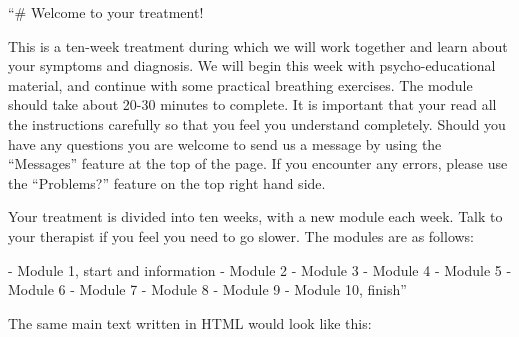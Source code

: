 \documentclass[
]{book}
\newenvironment{Shaded}{\begin{snugshade}}{\end{snugshade}}
\newcommand{\NormalTok}[1]{#1}
\newcommand{\SpecialStringTok}[1]{\textcolor[rgb]{0.31,0.60,0.02}{#1}}
\begin{document}
\begin{Shaded}
\begin{Highlighting}[]
\NormalTok{“\# Welcome to your treatment!}

\NormalTok{This is a ten{-}week treatment during which we will work together and learn}
\NormalTok{about your symptoms and diagnosis. We will begin this week with}
\NormalTok{psycho{-}educational material, and continue with some practical breathing}
\NormalTok{exercises. The module should take about 20{-}30 minutes to complete. It is}
\NormalTok{important that your read all the instructions carefully so that you feel}
\NormalTok{you understand completely. Should you have any questions you are welcome to}
\NormalTok{send us a message by using the “Messages” feature at the top of the page.}
\NormalTok{If you encounter any errors, please use the “Problems?” feature on the top}
\NormalTok{right hand side.}

\NormalTok{Your treatment is divided into ten weeks, with a new module each week. Talk}
\NormalTok{to your therapist if you feel you need to go slower. The modules are as}
\NormalTok{follows:}

\SpecialStringTok{{-} }\NormalTok{Module 1, start and information}
\SpecialStringTok{{-} }\NormalTok{Module 2}
\SpecialStringTok{{-} }\NormalTok{Module 3}
\SpecialStringTok{{-} }\NormalTok{Module 4}
\SpecialStringTok{{-} }\NormalTok{Module 5}
\SpecialStringTok{{-} }\NormalTok{Module 6}
\SpecialStringTok{{-} }\NormalTok{Module 7}
\SpecialStringTok{{-} }\NormalTok{Module 8}
\SpecialStringTok{{-} }\NormalTok{Module 9}
\SpecialStringTok{{-} }\NormalTok{Module 10, finish”}
\end{Highlighting}
\end{Shaded}

The same main text written in HTML would look like this:
\end{document}
